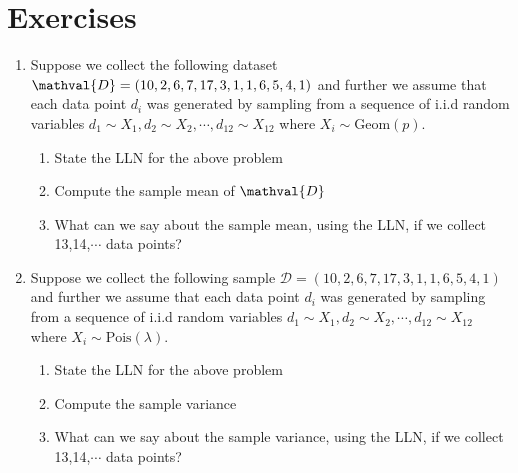 \section{Exercises}

\begin{enumerate}
    \item Suppose we collect the following dataset $\mathval{D} = (10,2,6,7,17,3,1,1,6,5,4,1)$ and further we assume that each data point $d_{i}$ was generated by sampling from a sequence of i.i.d random variables  $d_{1} \sim X_{1}, d_{2} \sim X_{2}, \cdots, d_{12} \sim X_{12}$ where $X_{i} \sim \text{Geom}(p)$.  
    \begin{enumerate}
        \item State the LLN for the above problem
        \item Compute the sample mean of $\mathval{D}$
        \item What can we say about the sample mean, using the LLN, if we collect 13,14,$\cdots$ data points?  
    \end{enumerate}
    
    \item  Suppose we collect the following sample $\mathcal{D} = (10,2,6,7,17,3,1,1,6,5,4,1)$ and further we assume that each data point $d_{i}$ was generated by sampling from a sequence of i.i.d random variables  $d_{1} \sim X_{1}, d_{2} \sim X_{2}, \cdots, d_{12} \sim X_{12}$ where $X_{i} \sim \text{Pois}(\lambda)$.
    \begin{enumerate}
        \item State the LLN for the above problem
        \item Compute the sample variance
        \item What can we say about the sample variance, using the LLN, if we collect 13,14,$\cdots$ data points?
    \end{enumerate}
    

\end{enumerate}
